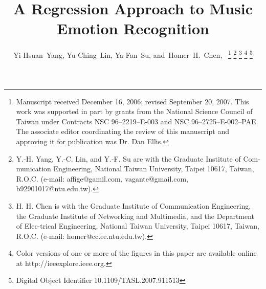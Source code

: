 \documentclass[journal, twoside]{IEEEtran}
\begin{document}
%
\title{A Regression Approach to Music\\ Emotion Recognition}
%
%
%

\author{Yi-Hsuan~Yang,
        Yu-Ching~Lin,
        Ya-Fan~Su,
        and~Homer~H.~Chen,~%
\thanks{Manuscript received December 16, 2006; revised September 20, 2007. This
work was supported in part by grants from the National Science Council of
Taiwan under Contracts NSC 96–2219–E-003 and NSC 96–2725–E-002–PAE.
The associate editor coordinating the review of this manuscript and approving
it for publication was Dr. Dan Ellis.}%
\thanks{Y.-H. Yang, Y.-C. Lin, and Y.-F. Su are with the Graduate Institute of Com-munication Engineering, National Taiwan University, Taipei 10617, Taiwan, R.O.C. (e-mail: affige@gamil.com, vagante@gmail.com, b92901017@ntu.edu.tw).}%
\thanks{H. H. Chen is with the Graduate Institute of Communication Engineering, the Graduate Institute of Networking and Multimedia, and the Department of Elec-trical Engineering, National Taiwan University, Taipei 10617, Taiwan, R.O.C. (e-mail: homer@cc.ee.ntu.edu.tw).}
\thanks{Color versions of one or more of the figures in this paper are available online at http://ieeexplore.ieee.org.}
\thanks{Digital Object Identifier 10.1109/TASL.2007.911513}}


% 
%
\end{document}

